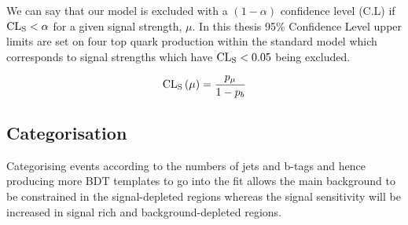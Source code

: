 We can say that our model is excluded with a $\left(1-\alpha \right)$ confidence level (C.L) if ${\textrm{CL}}_{\textrm{S}} < \alpha$ for a given signal strength, $\mu$. In this thesis 95\% Confidence Level upper limits are set on four top quark production 
within the standard model which corresponds to signal strengths which have ${\textrm{CL}}_{\textrm{S}} < 0.05$ being excluded.

\begin{equation}
{\textrm{CL}}_{\textrm{S}}\left(\mu\right) = \frac{p_{\mu}}{1-p_{b}}
\end{equation}











\subsection{Categorisation}
\label{sec:Cats}

Categorising events according to the numbers of jets and b-tags and hence producing more BDT templates to go into the fit allows the main \ttbar background to be constrained in the signal-depleted regions whereas the signal sensitivity will be increased in signal rich and background-depleted regions.


